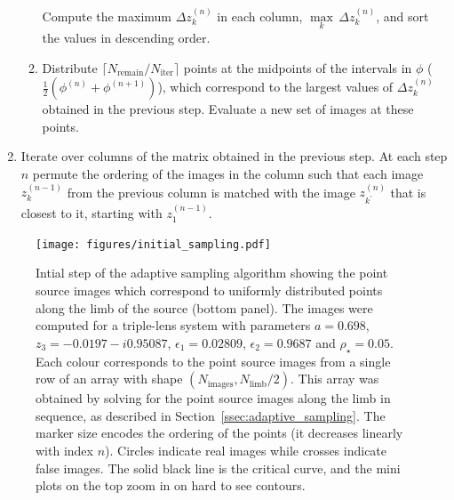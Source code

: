 \documentclass[12pt,dvipsnames]{report}
\begin{document}
\begin{enumerate}
\begin{enumerate}
    Compute the maximum $\Delta z^{(n)}_k$ in each column, 
    $\underset{k}{\operatorname{max}}\,\Delta z^{(n)}_k$, and sort the values in descending 
    order. 
    \item Distribute $\lceil N_\mathrm{remain}/N_\mathrm{iter}\rceil$ points at the 
    midpoints of the intervals in $\phi$ ($\frac{1}{2}(\phi^{(n)}+\phi^{(n+1)})$), 
    which correspond to the largest values of $\Delta z^{(n)}_k$  obtained in the 
    previous step. 
    Evaluate a new set of images at these points.
\end{enumerate}
    \item Iterate over columns of the matrix obtained in the previous step. 
    At each step $n$ permute the ordering of the 
    images in the column such that each image $z^{(n-1)}_k$ from the previous column is 
    matched with  the image  $z^{(n)}_{k^\prime}$ that is closest to it, 
    starting with $z^{(n-1)}_1$.
\end{enumerate}

\begin{figure}[!t]
    \begin{centering}
        \texttt{[image: figures/initial\_sampling.pdf]}
        \caption{Intial step of the adaptive sampling algorithm showing the point source
        images which correspond to uniformly distributed points along the limb of the source
        (bottom panel).
The images were computed for a triple-lens system with parameters $a=0.698$, 
$z_3=-0.0197 - i0.95087$, $\epsilon_1=0.02809$, $\epsilon_2=0.9687$ and $\rho_\star=0.05$.
Each colour corresponds to the point source images from a single row of an array with 
shape $(N_\mathrm{images}, N_\mathrm{limb}/2)$. This array was obtained by solving for the 
point source images along the limb in sequence, as described in Section~\ref{ssec:adaptive_sampling}. 
The marker size encodes the ordering of the points (it decreases linearly with index $n$).
Circles indicate real images while crosses indicate false images.
The solid black line is the critical curve, and the mini plots on the top zoom in on hard to 
see contours.}
        \label{fig:initial_sampling}
    \end{centering}
\end{figure}
\end{document}
